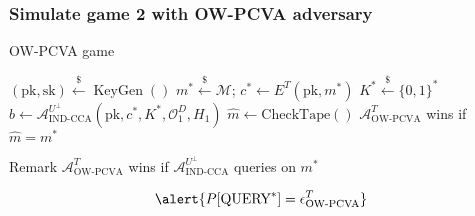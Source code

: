 \documentclass{beamer}
\newcommand{\leftsample}{\overset{{\scriptscriptstyle\$}}{\leftarrow}}
\begin{document}
\begin{frame}
    \frametitle{Simulate game 2 with OW-PCVA adversary}

    \begin{algorithm}[H]
        \SetAlgoLined
        \caption{OW-PCVA game}
        $(\text{pk}, \text{sk}) \leftsample \operatorname{KeyGen}()$\;
        $m^\ast \leftsample \mathcal{M}$;
        $c^\ast \leftarrow E^T(\text{pk}, m^\ast)$\;
        $K^\ast \leftsample \{0,1\}^\ast$\;
        $\hat{b} \leftarrow \mathcal{A}^{U^\bot}_\text{IND-CCA}(
            \text{pk}, c^\ast, K^\ast, \mathcal{O}^D_1, H_1
        )$\;
        $\hat{m} \leftarrow \operatorname{CheckTape()}$\;
        $\mathcal{A}^T_\text{OW-PCVA}$ wins if $\hat{m} = m^\ast$
    \end{algorithm}

    \begin{block}{Remark}
        $\mathcal{A}^T_\text{OW-PCVA}$ wins if $\mathcal{A}^{U^\bot}_\text{IND-CCA}$ queries on $m^\ast$

        \begin{equation*}
            \alert{P[\text{QUERY}^\ast] = \epsilon^T_\text{OW-PCVA}}
        \end{equation*}
    \end{block}

\end{frame}
\end{document}

